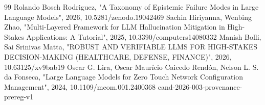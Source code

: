 \documentclass[conference]{IEEEtran}
\begin{document}
\begin{thebibliography}{99}
 Rolando Bosch Rodriguez, "A Taxonomy of Epistemic Failure Modes in Large Language Models", 2026, 10.5281/zenodo.19042469
 Sachin Hiriyanna, Wenbing Zhao, "Multi-Layered Framework for LLM Hallucination Mitigation in High-Stakes Applications: A Tutorial", 2025, 10.3390/computers14080332
 Manish Bolli, Sai Srinivas Matta, "ROBUST AND VERIFIABLE LLMS FOR HIGH-STAKES DECISION-MAKING (HEALTHCARE, DEFENSE, FINANCE)", 2026, 10.63125/xv9bab19
 Oscar G. Lira, Oscar Maurício Caicedo Rendón, Nelson L. S. da Fonseca, "Large Language Models for Zero Touch Network Configuration Management", 2024, 10.1109/mcom.001.2400368
 cand-2026-003-provenance-prereg-v1
\end{thebibliography}
\end{document}
